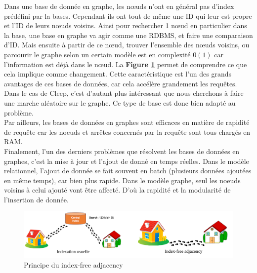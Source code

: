 \documentclass{article} %
\begin{document}
Dans une base de donnée en graphe, les nœuds n'ont en général pas d'index prédéfini par la bases. Cependant ils ont tout de même une ID qui leur est propre et l'ID de leurs nœuds voisins. Ainsi pour rechercher 1 nœud en particulier dans la base, une base en graphe va agir comme une RDBMS, et faire une comparaison d'ID. Mais ensuite à partir de ce nœud, trouver l'ensemble des nœuds voisins, ou parcourir le graphe selon un certain modèle est en complexité $0(1)$ car l'information est déjà dans le nœud. La \textbf{Figure \ref{fig:indfree}} permet de comprendre ce que cela implique comme changement. Cette caractéristique est l'un des grands avantages de ces bases de données, car cela accélère grandement les requêtes. Dans le cas de Cleep, c'est d'autant plus intéressant que nous cherchons à faire une marche aléatoire sur le graphe. Ce type de base est donc bien adapté au problème.\\
Par ailleurs, les bases de données en graphes sont efficaces en matière de rapidité de requête car les noeuds et arrêtes concernés par la requête sont tous chargés en RAM.\\
Finalement, l'un des derniers problèmes que résolvent les bases de données en graphes, c'est la mise à jour et l'ajout de donné en temps réelles. Dans le modèle relationnel, l'ajout de donnée se fait souvent en batch (plusieurs données ajoutées en même temps), car bien plus rapide. Dans le modèle graphe, seul les noeuds voisins à celui ajouté vont être affecté. D'où la rapidité et la modularité de l'insertion de donnée.\\

\begin{figure}[!h]
	\centering
	\includegraphics[keepaspectratio = true,scale=0.3]{indfree.png}
	\caption{Principe du index-free adjacency}
	\label{fig:indfree}
\end{figure}
\end{document}
